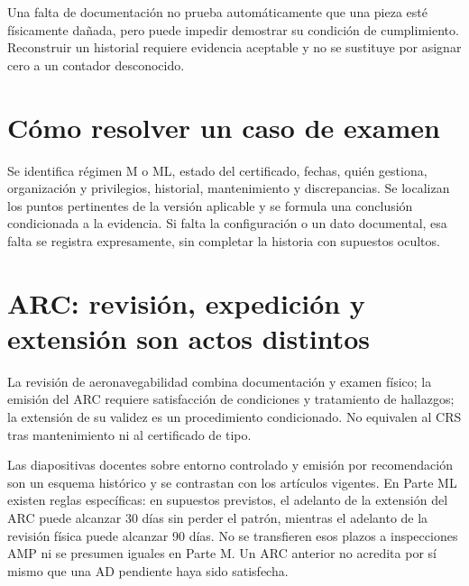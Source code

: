 Una falta de documentación no prueba automáticamente que una pieza esté físicamente dañada, pero puede impedir demostrar su condición de cumplimiento. Reconstruir un historial requiere evidencia aceptable y no se sustituye por asignar cero a un contador desconocido.
\section{Cómo resolver un caso de examen}
Se identifica régimen M o ML, estado del certificado, fechas, quién gestiona, organización y privilegios, historial, mantenimiento y discrepancias. Se localizan los puntos pertinentes de la versión aplicable y se formula una conclusión condicionada a la evidencia. Si falta la configuración o un dato documental, esa falta se registra expresamente, sin completar la historia con supuestos ocultos.
\section{ARC: revisión, expedición y extensión son actos distintos}
La revisión de aeronavegabilidad combina documentación y examen físico; la emisión del ARC requiere satisfacción de condiciones y tratamiento de hallazgos; la extensión de su validez es un procedimiento condicionado. No equivalen al CRS tras mantenimiento ni al certificado de tipo.

Las diapositivas docentes sobre entorno controlado y emisión por recomendación son un esquema histórico y se contrastan con los artículos vigentes. En Parte ML existen reglas específicas: en supuestos previstos, el adelanto de la extensión del ARC puede alcanzar 30 días sin perder el patrón, mientras el adelanto de la revisión física puede alcanzar 90 días. No se transfieren esos plazos a inspecciones AMP ni se presumen iguales en Parte M. Un ARC anterior no acredita por sí mismo que una AD pendiente haya sido satisfecha.


